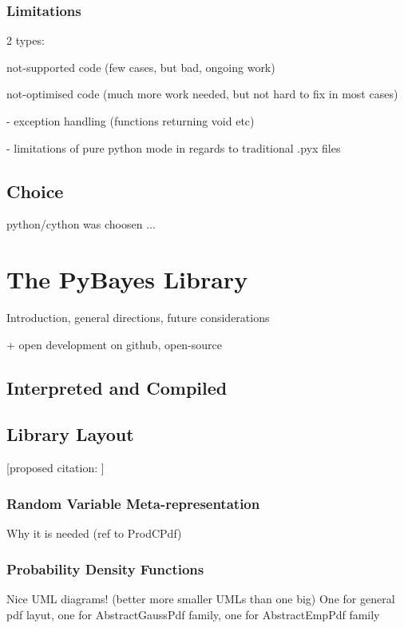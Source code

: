 \documentclass[a4paper,12pt,oneside]{report}
\begin{document}
\subsection{Limitations}

2 types:

	not-supported code (few cases, but bad, ongoing work)

	not-optimised code (much more work needed, but not hard to fix in most cases)

		- exception handling (functions returning void etc)

		- limitations of pure python mode in regards to traditional .pyx files

\section{Choice}

python/cython was choosen ...


\chapter{The PyBayes Library}

Introduction, general directions, future considerations

+ open development on github, open-source

\section{Interpreted and Compiled}

\section{Library Layout}

[proposed citation: \cite{Smi:05}]

\subsection{Random Variable Meta-representation}

Why it is needed (ref to ProdCPdf)

\subsection{Probability Density Functions}

Nice UML diagrams! (better more smaller UMLs than one big) One for general pdf layut, one for
AbstractGaussPdf family, one for AbstractEmpPdf family
\end{document}
